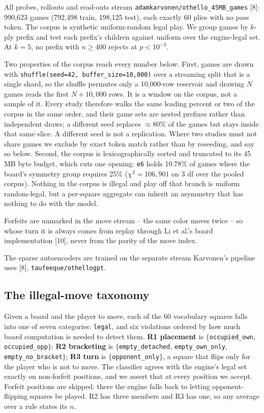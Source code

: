 \documentclass{article}
\begin{document}
All probes, rollouts and read-outs stream \texttt{adamkarvonen/othello\_45MB\_games} [8]: 990,623
games (792,498 train, 198,125 test), each exactly 60 plies with no pass token. The corpus is
synthetic uniform-random legal play. We group games by $k$-ply prefix and test each prefix's
children against uniform over the engine-legal set. At $k = 5$, no prefix with $n \ge 400$
rejects at $p < 10^{-3}$.

Two properties of the corpus reach every number below. First, games are drawn with
\texttt{shuffle(seed=42, buffer\_size=10{,}000)} over a streaming split that is a single shard,
so the shuffle permutes only a 10,000-row reservoir and drawing $N$ games reads the first
$N + 10{,}000$ rows. It is a window on the corpus, not a sample of it. Every study therefore walks the same leading percent or two of the
corpus in the same order, and their game sets are nested prefixes rather than independent
draws; a different seed replaces $\approx 80\%$ of the games but stays inside that same slice. A
different seed is not a replication.
Where two studies must not share games we exclude by exact token match rather than by
reseeding, and say so below. Second, the corpus is lexicographically sorted and truncated to
its 45\,MB byte budget, which cuts one opening: \texttt{e6} holds 10.78\% of games where the
board's symmetry group requires 25\% ($\chi^2 = 106{,}901$ on 3 df over the pooled corpus). Nothing in the corpus is
illegal and play off that branch is uniform random-legal, but a per-square aggregate can
inherit an asymmetry that has nothing to do with the model.

Forfeits are unmarked in the move stream -- the same color moves twice -- so whose turn it
is always comes from replay through Li et al.'s board implementation [10], never from the
parity of the move index.

The sparse autoencoders are trained on the separate stream Karvonen's pipeline uses [8],
\texttt{taufeeque/othellogpt}.

\subsection{The illegal-move taxonomy}

Given a board and the player to move, each of the 60 vocabulary squares falls into one of seven
categories: \texttt{legal}, and six violations ordered by how much board computation is needed
to detect them. \textbf{R1 placement} is $\{$\texttt{occupied\_own}, \texttt{occupied\_opp}$\}$;
\textbf{R2 bracketing} is $\{$\texttt{empty\_detached}, \texttt{empty\_own\_only},
\texttt{empty\_no\_bracket}$\}$; \textbf{R3 turn} is $\{$\texttt{opponent\_only}$\}$, a square
that flips only for the player who is not to move. The classifier agrees with the engine's legal
set exactly on non-forfeit positions, and we assert that at every position we accept. Forfeit
positions are skipped: there the engine falls back to letting opponent-flipping squares be
played. R2 has three members and R3 has one, so any average over a rule states its $n$.
\end{document}
